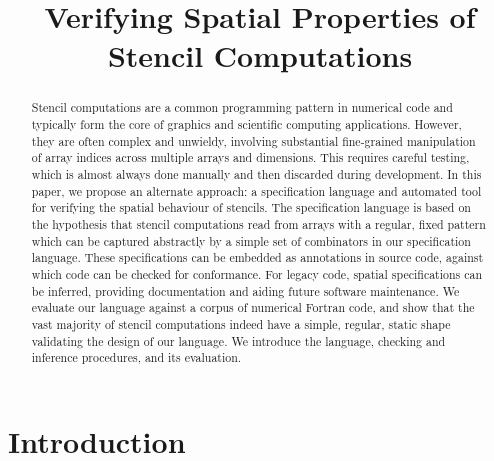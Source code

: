 \documentclass[10pt,preprint,numbers]{sigplanconf}
\title{Verifying Spatial Properties of Stencil Computations}
\theoremstyle{definition}
\begin{document}
\maketitle



\begin{abstract}
Stencil computations are a common programming pattern in numerical
  code and typically form the core of graphics and scientific
  computing applications. However, they are often complex and
  unwieldy, involving substantial fine-grained manipulation of array
  indices across multiple arrays and dimensions. This requires careful
  testing, which is almost always done manually and then discarded
  during development. In this paper, we propose an alternate approach:
  a specification language and automated tool for verifying the
  spatial behaviour of stencils. The specification language is based
  on the hypothesis that stencil computations read from arrays with a
  regular, fixed pattern which can be captured abstractly by a simple
  set of combinators in our specification language. These
  specifications can be embedded as annotations in source code,
  against which code can be checked for conformance. For legacy code,
  spatial specifications can be inferred, providing documentation and
  aiding future software maintenance. We evaluate our language against
  a corpus of numerical Fortran code, and show that the vast majority
  of stencil computations indeed have a simple, regular, static shape
  validating the design of our language.  We introduce the
  language, checking and inference procedures, and its evaluation.
\end{abstract}



\section{Introduction}\label{sec:intro}
\end{document}
